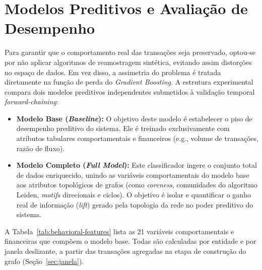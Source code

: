 \documentclass[titlepage,a4paper,oneside,onecolumn,12pt]{report}
\begin{document}
\section{Modelos Preditivos e Avaliação de Desempenho} 
\label{sec:modelos}

Para garantir que o comportamento real das transações seja preservado, optou-se por não aplicar algoritmos de reamostragem sintética, evitando assim distorções no espaço de dados. Em vez disso, a assimetria do problema é tratada diretamente na função de perda do \textit{Gradient Boosting}. A estrutura experimental compara dois modelos preditivos independentes submetidos à validação temporal \textit{forward-chaining}:

\begin{itemize}
    \item \textbf{Modelo Base (\textit{Baseline}):} O objetivo deste modelo é estabelecer o piso de desempenho preditivo do sistema. Ele é treinado exclusivamente com atributos tabulares comportamentais e financeiros (e.g., volume de transações, razão de fluxo).
    
    \item \textbf{Modelo Completo (\textit{Full Model}):} Este classificador ingere o conjunto total de dados enriquecido, unindo as variáveis comportamentais do modelo base aos atributos topológicos de grafos (como \textit{coreness}, comunidades do algoritmo Leiden, \textit{motifs} direcionais e ciclos). O objetivo é isolar e quantificar o ganho real de informação (\textit{lift}) gerado pela topologia da rede no poder preditivo do sistema.
\end{itemize}

A Tabela~\ref{tab:behavioral-features} lista as 21 variáveis comportamentais e financeiras que compõem o modelo base. Todas são calculadas por entidade e por janela deslizante, a partir das transações agregadas na etapa de construção do grafo (Seção~\ref{sec:janela}).
\end{document}
